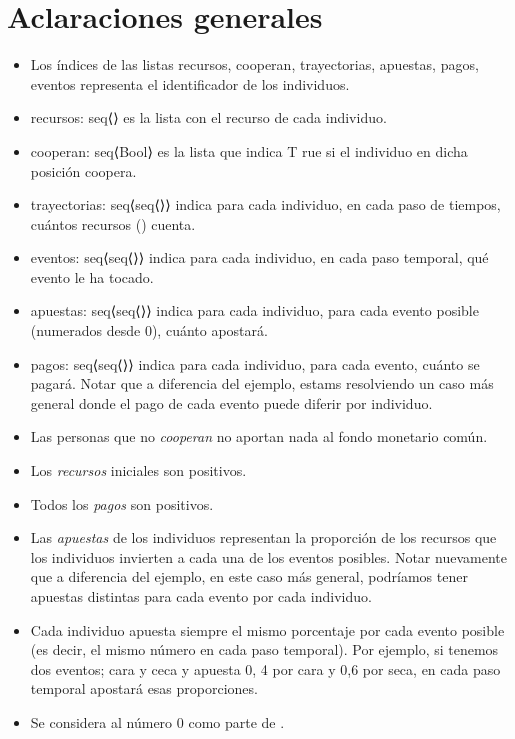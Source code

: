 \documentclass[10pt,a4paper]{article}
\begin{document}
\maketitle

\section{Aclaraciones generales} 


\begin{itemize}
	\item Los índices de las listas recursos, cooperan, trayectorias, apuestas, pagos, eventos representa el identificador de los
    individuos.
	\item recursos: seq⟨\real⟩ es la lista con el recurso de cada individuo.
	\item cooperan: seq⟨Bool⟩ es la lista que indica T rue si el individuo en dicha posición coopera.
	\item trayectorias: seq⟨seq⟨\real⟩⟩ indica para cada individuo, en cada paso de tiempos, cuántos recursos (\real) cuenta.
	\item eventos: seq⟨seq⟨\nat⟩⟩ indica para cada individuo, en cada paso temporal, qué evento le ha tocado.
	\item apuestas: seq⟨seq⟨\real⟩⟩ indica para cada individuo, para cada evento posible (numerados desde 0), cuánto apostará.
	\item pagos: seq⟨seq⟨\real⟩⟩ indica para cada individuo, para cada evento, cuánto se pagará. Notar que a diferencia del ejemplo, estams resolviendo un caso más general donde el pago de cada evento puede diferir por individuo.
	\item Las personas que no \textit{cooperan} no aportan nada al fondo monetario común.
	\item Los \textit{recursos} iniciales son positivos.
	\item Todos los \textit{pagos} son positivos.
	\item Las \textit{apuestas} de los individuos representan la proporción de los recursos que los individuos invierten a cada una de los eventos posibles. Notar nuevamente que a diferencia del ejemplo, en este caso más general, podríamos tener apuestas distintas para cada evento por cada individuo.
	\item Cada individuo apuesta siempre el mismo porcentaje por cada evento posible (es decir, el mismo número en cada paso temporal). Por ejemplo, si tenemos dos eventos; cara y ceca y apuesta 0, 4 por cara y 0,6 por seca, en cada paso temporal apostará esas proporciones.
    \item Se considera al número 0 como parte de \nat.
\end{itemize}
\end{document}
